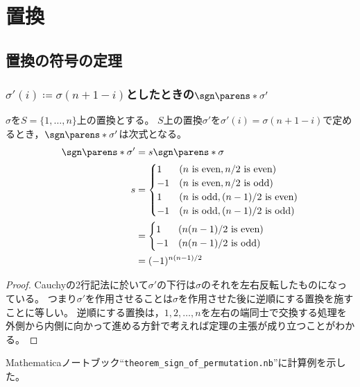 \chapter{置換}
    \section{置換の符号の定理}
        \subsection{\texorpdfstring{$\sigma'(i) \coloneq \sigma(n+1-i)$としたときの$\sgn\parens*{\sigma'}$}{σ'(i) := σ(n+1-i)としたときのsgn(σ')}}
            \label{置換の引数を逆順にしたときの符号}
            \begin{shadebox}
                $\sigma$を$S=\{1,\dotsc,n\}$上の置換とする。
                $S$上の置換$\sigma'$を$\sigma'(i) = \sigma(n+1-i)$で定めるとき，$\sgn\parens*{\sigma'}$は次式となる。
                \begin{align*}
                    \sgn\parens*{\sigma'} &= s\sgn\parens*{\sigma} \\
                    s &=
                    \begin{cases}
                        1 & (n \text{ is even}, n/2 \text{ is even}) \\
                        -1 & (n \text{ is even}, n/2 \text{ is odd}) \\
                        1 & (n \text{ is odd}, (n-1)/2 \text{ is even}) \\
                        -1 & (n \text{ is odd}, (n-1)/2 \text{ is odd})
                    \end{cases} \\
                    &=
                    \begin{cases}
                        1 & (n(n-1)/2 \text{ is even}) \\
                        -1 & (n(n-1)/2 \text{ is odd})
                    \end{cases} \\
                    &= (-1)^{n(n-1)/2}
                \end{align*}
            \end{shadebox}
            \begin{proof}
                Cauchyの2行記法に於いて$\sigma'$の下行は$\sigma$のそれを左右反転したものになっている。
                つまり$\sigma'$を作用させることは$\sigma$を作用させた後に逆順にする置換を施すことに等しい。
                逆順にする置換は，$1,2,\dotsc,n$を左右の端同士で交換する処理を外側から内側に向かって進める方針で考えれば定理の主張が成り立つことがわかる。
            \end{proof}
            Mathematicaノートブック``\nolinkurl{theorem_sign_of_permutation.nb}''に計算例を示した。
